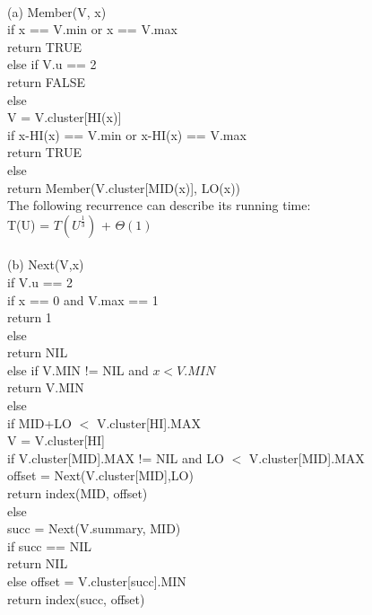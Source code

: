 \begin{problem}{5} ~\\
(a) Member(V, x)\\
\tab if x == V.min or x == V.max\\
\tab\tab return TRUE\\
\tab else if V.u == 2\\
\tab\tab return FALSE\\
\tab else\\
\tab\tab V = V.cluster[HI(x)]\\
\tab\tab if x-HI(x) == V.min or x-HI(x) == V.max\\
\tab\tab\tab return TRUE\\
\tab\tab else\\
\tab\tab\tab return Member(V.cluster[MID(x)], LO(x))
\\
\tab The following recurrence can describe its running time:\\
\tab\tab T(U) = $T({U}^{\frac{1}{3}})$ + $\Theta(1)$\\
\\
(b) Next(V,x)\\
\tab if V.u == 2\\
\tab\tab if x == 0 and V.max == 1\\
\tab\tab\tab return 1\\
\tab\tab else\\
\tab\tab\tab return NIL\\
\tab else if V.MIN != NIL and $x < V.MIN$\\
\tab\tab return V.MIN\\
\tab else\\ 
\tab\tab if MID+LO $<$ V.cluster[HI].MAX\\
\tab\tab\tab V = V.cluster[HI]\\
\tab\tab\tab if V.cluster[MID].MAX != NIL and LO $<$ V.cluster[MID].MAX\\
\tab\tab\tab\tab offset = Next(V.cluster[MID],LO)\\
\tab\tab\tab return index(MID, offset)\\
\tab\tab\tab else \\
\tab\tab\tab\tab succ = Next(V.summary, MID)\\
\tab\tab\tab\tab if succ == NIL\\
\tab\tab\tab\tab\tab return NIL\\
\tab\tab\tab\tab else offset = V.cluster[succ].MIN\\
\tab\tab\tab\tab\tab return index(succ, offset)\\

\end{problem}
